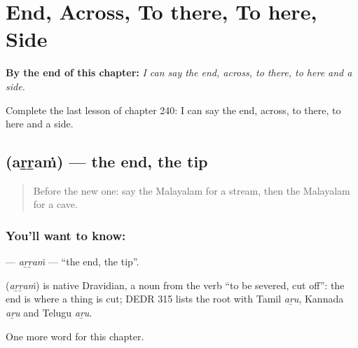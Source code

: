 
\chapter{End, Across, To there, To here, Side}
\label{ch:ml-end-across-to-there-to-here-side}

\begin{chapteropening}
\textbf{By the end of this chapter:} \emph{I can say the end, across, to there, to here and a side.}

Complete the last lesson of chapter 240: I can say the end, across, to there, to here and a side.
\end{chapteropening}

\section[\texorpdfstring{\ml{അറ്റം} (aṟṟaṁ)}{അറ്റം (aṟṟaṁ)}]{ (aṟṟaṁ) — the end, the tip}

\label{lesson:ML-C240-arram}



\begin{quote}
Before the new one: say the Malayalam for a stream, then the Malayalam for a cave.
\end{quote}

\subsection*{You'll want to know: }
\textbf{} — \emph{aṟṟaṁ} — \textquotedblleft{}the end, the tip\textquotedblright{}.

\begin{cousinweb}
\textbf{} (\emph{aṟṟaṁ}) is native Dravidian, a noun from the verb \textquotedblleft{}to be severed, cut off\textquotedblright{}: the end is where a thing is cut; DEDR 315 lists the root with Tamil \emph{aṟu}, Kannada \emph{aṟu} and Telugu \emph{aṟu}.
\end{cousinweb}

\begin{grammarlens}[title={What you've built}]
One more word for this chapter.
\end{grammarlens}

